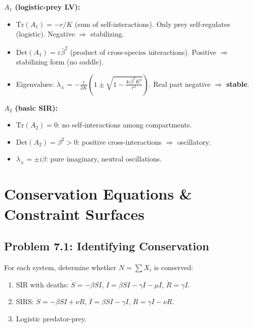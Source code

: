 \documentclass[10pt]{article}
\begin{document}
\begin{solution}
\textbf{$A_1$ (logistic-prey LV):}
\begin{itemize}
\item $\text{Tr}(A_1) = -r/K$ (sum of self-interactions). Only prey self-regulates (logistic). Negative $\Rightarrow$ stabilizing.
\item $\text{Det}(A_1) = \varepsilon\bar\beta^2$ (product of cross-species interactions). Positive $\Rightarrow$ stabilizing form (no saddle).
\item Eigenvalues: $\lambda_\pm = -\frac{r}{2K}\left(1 \pm \sqrt{1 - \frac{4\varepsilon\bar\beta^2 K^2}{r^2}}\right)$. Real part negative $\Rightarrow$ \textbf{stable}.
\end{itemize}

\textbf{$A_2$ (basic SIR):}
\begin{itemize}
\item $\text{Tr}(A_2) = 0$: no self-interactions among compartments.
\item $\text{Det}(A_2) = \beta^2 > 0$: positive cross-interactions $\Rightarrow$ oscillatory.
\item $\lambda_\pm = \pm i\beta$: pure imaginary, neutral oscillations.
\end{itemize}
\end{solution}

\newpage
\section{Conservation Equations \& Constraint Surfaces}

\subsection{Problem 7.1: Identifying Conservation}

\begin{problem}
For each system, determine whether $N = \sum X_i$ is conserved:
\begin{enumerate}[label=(\alph*)]
\item SIR with deaths: $\dot S = -\beta SI$, $\dot I = \beta SI - \gamma I - \mu I$, $\dot R = \gamma I$.
\item SIRS: $\dot S = -\beta SI + \nu R$, $\dot I = \beta SI - \gamma I$, $\dot R = \gamma I - \nu R$.
\item Logistic predator-prey.
\end{enumerate}
\end{problem}
\end{document}
